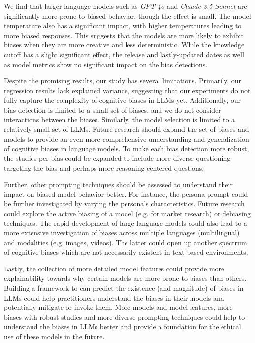 \par We find that larger language models such as \textit{GPT-4o} and \textit{Claude-3.5-Sonnet} are significantly more prone to biased behavior, though the effect is small. The model temperature also has a significant impact, with higher temperatures leading to more biased responses. This suggests that the models are more likely to exhibit biases when they are more creative and less deterministic. While the knowledge cutoff has a slight significant effect, the release and lastly-updated dates as well as model metrics show no significant impact on the bias detections.

\par Despite the promising results, our study has several limitations. Primarily, our regression results lack explained variance, suggesting that our experiments do not fully capture the complexity of cognitive biases in LLMs yet. Additionally, our bias detection is limited to a small set of biases, and we do not consider interactions between the biases. Similarly, the model selection is limited to a relatively small set of LLMs. Future research should expand the set of biases and models to provide an even more comprehensive understanding and generalization of cognitive biases in language models. To make each bias detection more robust, the studies per bias could be expanded to include more diverse questioning targeting the bias and perhaps more reasoning-centered questions.

\par Further, other prompting techniques should be assessed to understand their impact on biased model behavior better. For instance, the persona prompt could be further investigated by varying the persona's characteristics. Future research could explore the active biasing of a model (e.g. for market research) or debiasing techniques. The rapid development of large language models could also lead to a more extensive investigation of biases across multiple languages (multilingual) and modalities (e.g. images, videos). The latter could open up another spectrum of cognitive biases which are not necessarily existent in text-based environments.

\par Lastly, the collection of more detailed model features could provide more explainability towards why certain models are more prone to biases than others. Building a framework to can predict the existence (and magnitude) of biases in LLMs could help practitioners understand the biases in their models and potentially mitigate or invoke them. More models and model features, more biases with robust studies and more diverse prompting techniques could help to understand the biases in LLMs better and provide a foundation for the ethical use of these models in the future.